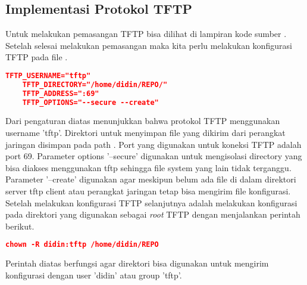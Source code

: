     	\subsection{Implementasi Protokol TFTP} 
    	Untuk melakukan pemasangan TFTP bisa dilihat di lampiran kode sumber .
    	Setelah selesai melakukan pemasangan maka kita perlu melakukan konfigurasi TFTP pada file .

	\begin{lstlisting}[frame=single,tabsize=2,breaklines,caption={Konfigurasi TFTP },label=nonrootuser, captionpos=b, language=json,numbers=none]
	TFTP_USERNAME="tftp"
	TFTP_DIRECTORY="/home/didin/REPO/"
	TFTP_ADDRESS=":69"
	TFTP_OPTIONS="--secure --create"
	\end{lstlisting}
		Dari pengaturan diatas menunjukkan bahwa protokol TFTP menggunakan username 'tftp'. Direktori untuk menyimpan file yang dikirim dari perangkat jaringan disimpan pada path . Port yang digunakan untuk koneksi TFTP adalah port 69. Parameter options '--secure' digunakan untuk mengisolasi directory yang bisa diakses menggunakan tftp sehingga file system yang lain tidak terganggu. Parameter '--create' digunakan agar meskipun belum ada file di dalam direktori server tftp client atau perangkat jaringan tetap bisa mengirim file konfigurasi.\\
        \indent Setelah melakukan konfigurasi TFTP selanjutnya adalah melakukan konfigurasi pada direktori yang digunakan sebagai \textit{root} TFTP dengan menjalankan perintah berikut.
    \begin{lstlisting}[frame=single,tabsize=2,breaklines,caption={Konfigurasi direktori TFTP },label=nonrootuser, captionpos=b, language=json,numbers=none]
    chown -R didin:tftp /home/didin/REPO
    \end{lstlisting}
    Perintah diatas berfungsi agar direktori  bisa digunakan untuk mengirim konfigurasi dengan user 'didin' atau group 'tftp'.\\
    
